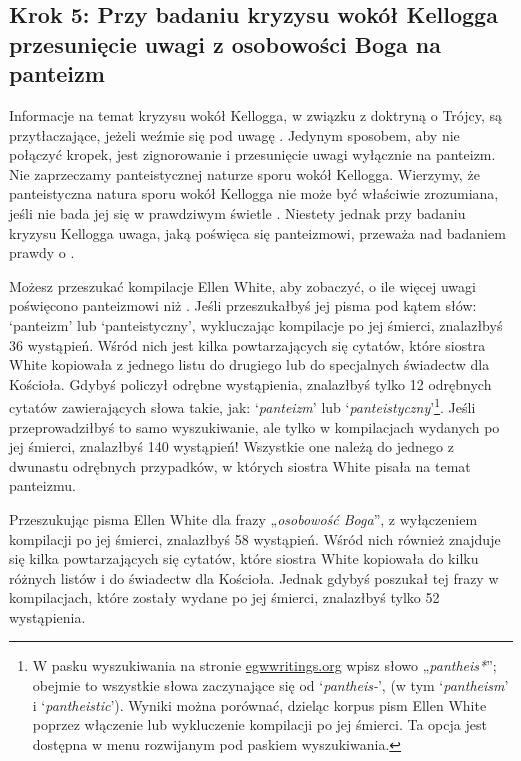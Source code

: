 \subsection*{Krok 5: Przy badaniu kryzysu wokół Kellogga przesunięcie uwagi z osobowości Boga na panteizm}

Informacje na temat kryzysu wokół Kellogga, w związku z doktryną o Trójcy, są przytłaczające, jeżeli weźmie się pod uwagę . Jedynym sposobem, aby nie połączyć kropek, jest zignorowanie  i przesunięcie uwagi wyłącznie na panteizm. Nie zaprzeczamy panteistycznej naturze sporu wokół Kellogga. Wierzymy, że panteistyczna natura sporu wokół Kellogga nie może być właściwie zrozumiana, jeśli nie bada jej się w prawdziwym świetle . Niestety jednak przy badaniu kryzysu Kellogga uwaga, jaką poświęca się panteizmowi, przeważa nad badaniem prawdy o .

Możesz przeszukać kompilacje Ellen White, aby zobaczyć, o ile więcej uwagi poświęcono panteizmowi niż . Jeśli przeszukałbyś jej pisma pod kątem słów: ‘panteizm’ lub ‘panteistyczny’, wykluczając kompilacje po jej śmierci, znalazłbyś 36 wystąpień. Wśród nich jest kilka powtarzających się cytatów, które siostra White kopiowała z jednego listu do drugiego lub do specjalnych świadectw dla Kościoła. Gdybyś policzył odrębne wystąpienia, znalazłbyś tylko 12 odrębnych cytatów zawierających słowa takie, jak: ‘\textit{panteizm}’ lub ‘\textit{panteistyczny}’\footnote{W pasku wyszukiwania na stronie \href{https://egwwritings.org/}{egwwritings.org} wpisz słowo „\textit{pantheis*}”; obejmie to wszystkie słowa zaczynające się od ‘\textit{pantheis-}’, (w tym ‘\textit{pantheism}’ i ‘\textit{pantheistic}’). Wyniki można porównać, dzieląc korpus pism Ellen White poprzez włączenie lub wykluczenie kompilacji po jej śmierci. Ta opcja jest dostępna w menu rozwijanym pod paskiem wyszukiwania.}. Jeśli przeprowadziłbyś to samo wyszukiwanie, ale tylko w kompilacjach wydanych po jej śmierci, znalazłbyś 140 wystąpień! Wszystkie one należą do jednego z dwunastu odrębnych przypadków, w których siostra White pisała na temat panteizmu.

Przeszukując pisma Ellen White dla frazy „\textit{osobowość Boga}”, z wyłączeniem kompilacji po jej śmierci, znalazłbyś 58 wystąpień. Wśród nich również znajduje się kilka powtarzających się cytatów, które siostra White kopiowała do kilku różnych listów i do świadectw dla Kościoła. Jednak gdybyś poszukał tej frazy w kompilacjach, które zostały wydane po jej śmierci, znalazłbyś tylko 52 wystąpienia.

